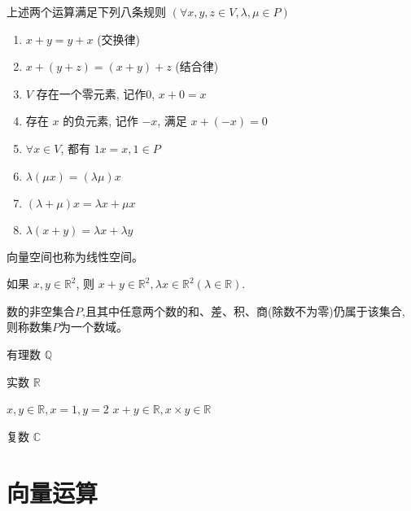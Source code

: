 \begin{theorem}
    上述两个运算满足下列八条规则 \( (\forall x, y, z \in V, \lambda, \mu \in P) \) 
\begin{enumerate}
    \item \( x+y=y+x \) (交换律) 
    \item \( x+(y+z)=(x+y)+z \) (结合律)
    \item \( V \) 存在一个零元素, 记作$0$, \( x+0=x \)
    \item 存在 \( x \) 的负元素, 记作 \( -x \), 满足 \( x+(-x)=0 \)
    \item \( \forall x \in V \), 都有 \( 1 x=x, 1 \in P \)
    \item \( \lambda(\mu x)=(\lambda \mu) x \)
    \item \( (\lambda+\mu) x=\lambda x+\mu x \)
    \item \(  \lambda(x+y)=\lambda x+\lambda y \)
\end{enumerate}
\end{theorem}

\begin{corollary}
    向量空间也称为线性空间。
\end{corollary}

\begin{corollary}
    如果 \( x, y \in \mathbb{R}^{2} \), 则 \( x+y \in \mathbb{R}^{2}, \lambda x \in \mathbb{R}^{2}(\lambda \in \mathbb{R}) \).
\end{corollary}

\begin{definition}[数域]
    数的非空集合$P$,且其中任意两个数的和、差、积、商(除数不为零)仍属于该集合, 则称数集$P$为一个数域。 
\end{definition}

\begin{example}
    有理数 $ \mathbb{Q} $
\end{example}

\begin{example}
    实数 $ \mathbb{R} $

    $ x, y \in \mathbb{R}, x=1, y=2 $
    $ x+y \in \mathbb{R}  ,x \times y \in \mathbb{R} $
\end{example}

\begin{example}
    复数 $ \mathbb{C} $
\end{example}

\section{向量运算}

